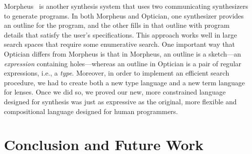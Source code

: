 \documentclass{svproc}
\begin{document}
Morpheus~\cite{morpheus} is another synthesis system that uses two
communicating synthesizers to generate programs.  In both Morpheus and
Optician, one synthesizer provides an 
outline for the program, and the other fills in that outline with program
details that satisfy the user's specifications.
This approach works well in large search spaces that require some enumerative
search.
One important way that Optician differs from Morpheus is that in
Morpheus, an outline is a sketch---an
\emph{expression}
containing holes---whereas
an outline in Optician is a pair of regular
expressions, i.e., a 
\emph{type}.  Moreover, in order to implement an efficient
search procedure, we had to create both a new type language and a new
term language for lenses.  Once we did so, we proved our new, more
constrained language
designed for synthesis was just as expressive as the original, more
flexible and compositional language designed for human programmers.


\section{Conclusion and Future Work}
\label{concl}


\end{document}
